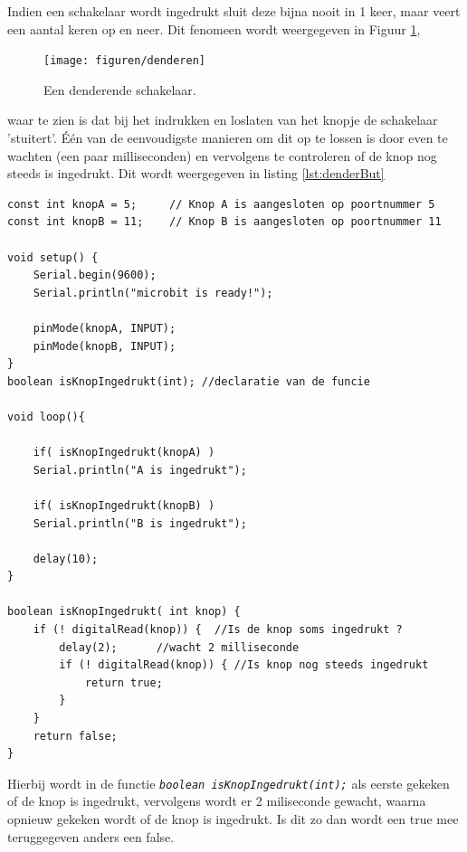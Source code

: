 Indien een schakelaar wordt ingedrukt sluit deze bijna nooit in 1 keer, maar veert een aantal keren op en neer. Dit fenomeen wordt weergegeven in Figuur \ref{fig:swDend}, 
\begin{figure}[h!]
	\captionsetup{justification=centering}
	\texttt{[image: figuren/denderen]}
	\centering
	\caption{Een denderende schakelaar\cite{williams2014make}.}
	\label{fig:swDend}
\end{figure}
waar te zien is dat bij het indrukken en loslaten van het knopje de schakelaar 'stuitert'. 
Één van de eenvoudigste manieren om dit op te lossen is door even te wachten (een paar milliseconden) en vervolgens te controleren of de knop nog steeds is ingedrukt. Dit wordt weergegeven in listing \ref{lst:denderBut}
\newpage
\begin{lstlisting}[caption= Omgaan met een denderende schakelaar.,label={lst:denderBut}]
const int knopA = 5;     // Knop A is aangesloten op poortnummer 5
const int knopB = 11;    // Knop B is aangesloten op poortnummer 11

void setup() {  
	Serial.begin(9600);
	Serial.println("microbit is ready!");
	
	pinMode(knopA, INPUT);  
	pinMode(knopB, INPUT);   
}
boolean isKnopIngedrukt(int); //declaratie van de funcie

void loop(){
	
	if( isKnopIngedrukt(knopA) )
	Serial.println("A is ingedrukt");
	
	if( isKnopIngedrukt(knopB) )
	Serial.println("B is ingedrukt");       
	
	delay(10);
}

boolean isKnopIngedrukt( int knop) {
	if (! digitalRead(knop)) {  //Is de knop soms ingedrukt ?
		delay(2);      //wacht 2 milliseconde 
		if (! digitalRead(knop)) { //Is knop nog steeds ingedrukt
			return true;
		}
	}
	return false;
}
\end{lstlisting}

Hierbij wordt in de functie \texttt{\textit{\textcolor{arduinoBlue}{boolean} isKnopIngedrukt(\textcolor{arduinoBlue}{int});}} als eerste gekeken of de knop is ingedrukt, vervolgens wordt er 2 miliseconde gewacht, waarna opnieuw gekeken wordt of de knop is ingedrukt. Is dit zo dan wordt een \textcolor{arduinoBlue}{true} mee teruggegeven anders een \textcolor{arduinoBlue}{false}.

